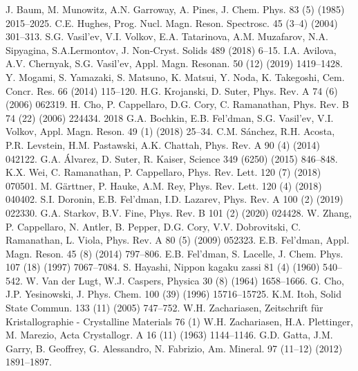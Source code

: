 \begin{thebibliography}{}
 J. Baum, M. Munowitz, A.N. Garroway, A. Pines, J. Chem. Phys. 83 (5) (1985) 2015–2025.
 C.E. Hughes, Prog. Nucl. Magn. Reson. Spectrosc. 45 (3–4) (2004) 301–313.
 S.G. Vasil’ev, V.I. Volkov, E.A. Tatarinova, A.M. Muzafarov, N.A. Sipyagina, S.A.Lermontov, J. Non-Cryst. Solids 489 (2018) 6–15.
 I.A. Avilova, A.V. Chernyak, S.G. Vasil’ev, Appl. Magn. Resonan. 50 (12) (2019) 1419–1428.
 Y. Mogami, S. Yamazaki, S. Matsuno, K. Matsui, Y. Noda, K. Takegoshi, Cem. Concr. Res. 66 (2014) 115–120.
 H.G. Krojanski, D. Suter, Phys. Rev. A 74 (6) (2006) 062319.
 H. Cho, P. Cappellaro, D.G. Cory, C. Ramanathan, Phys. Rev. B 74 (22) (2006) 224434.
2018 G.A. Bochkin, E.B. Fel’dman, S.G. Vasil’ev, V.I. Volkov, Appl. Magn. Reson. 49 (1) (2018) 25–34.
 C.M. Sánchez, R.H. Acosta, P.R. Levstein, H.M. Pastawski, A.K. Chattah, Phys. Rev. A 90 (4) (2014) 042122.
 G.A. Álvarez, D. Suter, R. Kaiser, Science 349 (6250) (2015) 846–848.
 K.X. Wei, C. Ramanathan, P. Cappellaro, Phys. Rev. Lett. 120 (7) (2018) 070501.
 M. G\"arttner, P. Hauke, A.M. Rey, Phys. Rev. Lett. 120 (4) (2018) 040402.
 S.I. Doronin, E.B. Fel’dman, I.D. Lazarev, Phys. Rev. A 100 (2) (2019) 022330.
 G.A. Starkov, B.V. Fine, Phys. Rev. B 101 (2) (2020) 024428.
 W. Zhang, P. Cappellaro, N. Antler, B. Pepper, D.G. Cory, V.V. Dobrovitski, C. Ramanathan, L. Viola, Phys. Rev. A 80 (5) (2009) 052323.
 E.B. Fel’dman, Appl. Magn. Reson. 45 (8) (2014) 797–806.
 E.B. Fel’dman, S. Lacelle, J. Chem. Phys. 107 (18) (1997) 7067–7084.
 S. Hayashi, Nippon kagaku zassi 81 (4) (1960) 540–542.
 W. Van der Lugt, W.J. Caspers, Physica 30 (8) (1964) 1658–1666.
 G. Cho, J.P. Yesinowski, J. Phys. Chem. 100 (39) (1996) 15716–15725.
 K.M. Itoh, Solid State Commun. 133 (11) (2005) 747–752.
 W.H. Zachariasen, Zeitschrift für Kristallographie - Crystalline Materials 76 (1) %
 W.H. Zachariasen, H.A. Plettinger, M. Marezio, Acta Crystallogr. A 16 (11) (1963) 1144–1146.
 G.D. Gatta, J.M. Garry, B. Geoffrey, G. Alessandro, N. Fabrizio, Am. Mineral. 97 (11–12) (2012) 1891–1897.

\end{thebibliography}
